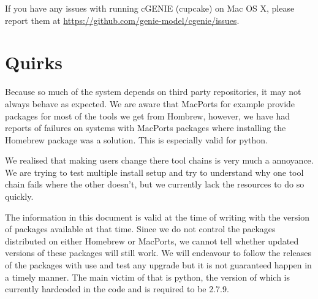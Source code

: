 \documentclass{scrartcl}
\begin{document}
If you have any issues with running cGENIE (cupcake) on Mac OS X, please report them at
\url{https://github.com/genie-model/cgenie/issues}.

\section{Quirks}

Because so much of the system depends on third party repositories, it may not
always behave as expected. We are aware that MacPorts for example provide
packages for most of the tools we get from Hombrew, however, we have had
reports of failures on systems with MacPorts packages where installing the
Homebrew package was a solution. This is especially valid for python.

We realised that making users change there tool chains is very much a
annoyance. We are trying to test multiple install setup and try to understand
why one tool chain fails where the other doesn't, but we currently lack the
resources to do so quickly.

The information in this document is valid at the time of writing with the
version of packages available at that time. Since we do not control the
packages distributed on either Homebrew or MacPorts, we cannot tell whether
updated versions of these packages will still work. We will endeavour to follow
the releases of the packages with use and test any upgrade but it is not
guaranteed happen in a timely manner. The main victim of that is python, the
version of which is currently hardcoded in the code and is required to be
2.7.9.
\end{document}

